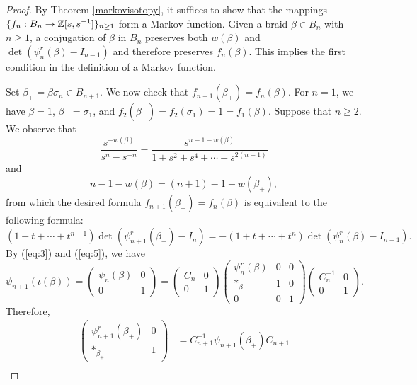 \begin{proof}
  By Theorem \ref{markovisotopy}, it suffices to show that the mappings $\{f_n: B_n \to \mathbb{Z}[s, s^{-1}]\}_{n\geq 1}$ form a Markov function. Given a braid $\beta \in B_n$ with $n\geq 1$, a conjugation of $\beta$ in $B_n$ preserves both $w(\beta)$ and $\det(\psi_n^r (\beta) - I_{n-1})$ and therefore preserves $f_n(\beta)$. This implies the first condition in the definition of a Markov function.
  
  Set $\beta_+ = \beta \sigma_n \in B_{n+1}$. We now check that $f_{n+1}(\beta_+) = f_n(\beta)$. For $n=1$, we have $\beta=1$, $\beta_+ = \sigma_1$, and $f_2(\beta_+) = f_2(\sigma_1) = 1 = f_1(\beta)$. Suppose that $n\geq 2$. We observe that 
\begin{displaymath}
\frac{s^{-w(\beta)}}{s^n - s^{-n}} = \frac{s^{n-1-w(\beta)}}{1+s^2 + s^4 + \cdots + s^{2(n-1)}}
\end{displaymath}
and 
\begin{displaymath}
n-1-w(\beta) = (n+1) - 1 - w(\beta_+),
\end{displaymath}
from which the desired formula $f_{n+1}(\beta_+) = f_n(\beta)$ is equivalent to the following formula: 
\begin{equation}
\label{eq:2}
(1+t+\cdots + t^{n-1})\det(\psi_{n+1}^r(\beta_+) - I_n) = -(1 + t + \cdots + t^n)\det(\psi_n^r (\beta) - I_{n-1}).
\end{equation}
By (\ref{eq:3}) and (\ref{eq:5}), we have 
\begin{displaymath}
\psi_{n+1}(\iota(\beta)) = \begin{pmatrix} \psi_n(\beta) & 0 \\ 0 & 1 \end{pmatrix} = \begin{pmatrix} C_n & 0 \\ 0 & 1 \end{pmatrix} \begin{pmatrix} \psi_n^r(\beta) & 0 & 0 \\ *_{\beta} & 1 & 0 \\ 0 & 0 & 1\end{pmatrix} \begin{pmatrix} C_n^{-1} & 0 \\ 0 & 1 \end{pmatrix}.
\end{displaymath}
Therefore, 
\begin{align*}
  \begin{pmatrix} \psi_{n+1}^r (\beta_+) & 0 \\ *_{\beta_+} & 1 \end{pmatrix} &= C_{n+1}^{-1} \psi_{n+1}(\beta_+) C_{n+1} \\

\end{align*}
\end{proof}
